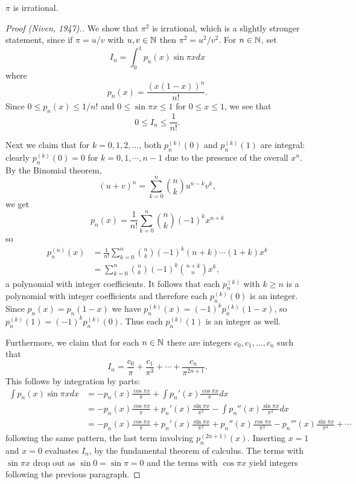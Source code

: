 \documentclass{mathnotes}
\begin{document}
\newpage
\begin{thm}[Lambert, 1761]
   $\pi$ is irrational.
\end{thm}
\begin{proof}[Proof (Niven, 1947).]
    We show that $\pi^2$ is irrational, which is a slightly stronger statement,
    since if $\pi=u/v$ with $u,v\in\mathbb{N}$ then $\pi^2=u^2/v^2$. For $n\in\mathbb{N}$, set
    \[I_n=\int_0^1p_n(x)\sin\pi x dx\]
    where 
    \[p_n(x)=\frac{(x(1-x))^n}{n!}.\]
    Since $0\leq p_n(x)\leq1/n!$ and $0\leq\sin\pi x\leq1$ for $0\leq x\leq 1$, we see that
    \begin{equation}
        0\leq I_n\leq\frac{1}{n!}.
        \label{eq:niven_est}
    \end{equation}

    Next we claim that for $k=0,1,2,\ldots$, both $p_n^{(k)}(0)$ and $p_n^{(k)}(1)$ are integral:
    clearly $p_n^{(k)}(0)=0$ for $k=0,1,\cdots,n-1$ due to the presence of the overall $x^n$. By
    the Binomial theorem,
    \[(u+v)^n=\sum_{k=0}^n \binom{n}{k}u^{n-k}v^k,\]
    we get
    \[p_n(x)=\frac{1}{n!}\sum_{k=0}^n\binom{n}{k}(-1)^kx^{n+k}\]
    so
    \begin{align*}
        p_n^{(n)}(x)&=\frac{1}{n!}\sum_{k=0}^n\binom{n}{k}(-1)^k(n+k)\cdots(1+k)x^k\\
        &=\sum_{k=0}^n\binom{n}{k}(-1)^k\binom{n+k}{n}x^k,
    \end{align*}
    a polynomial with integer coefficients. It follows that each $p_n^{(k)}$ with $k\geq n$
    is a polynomial with integer coefficients and therefore each $p_n^{(k)}(0)$ is an integer.
    Since $p_n(x)=p_n(1-x)$ we have $p_n^{(k)}(x)=(-1)^kp_n^{(k)}(1-x)$, so $p_n^{(k)}(1)=(-1)^kp_n^{(k)}(0)$.
    Thus each $p_n^{(k)}(1)$ is an integer as well.

    Furthermore, we claim that for each $n\in\mathbb{N}$ there are integers $c_0,c_1,\ldots,c_n$ such
    that
    \[I_n=\frac{c_0}{\pi}+\frac{c_1}{\pi^3}+\cdots+\frac{c_n}{\pi^{2n+1}}.\]
    This follows by integration by parts:
    \begin{align*}
        \int p_n(x)\sin\pi x dx &= -p_n(x)\frac{\cos\pi x}{\pi}+\int p_n'(x)\frac{\cos\pi x}{\pi} dx\\
        &=-p_n(x)\frac{\cos\pi x}{\pi} + p_n'(x)\frac{\sin\pi x}{\pi^2}-\int p_n''(x)\frac{\sin\pi x}{\pi^2}dx\\
        &= -p_n(x)\frac{\cos\pi x}{\pi}+p_n'(x)\frac{\sin \pi x}{\pi^2}+p_n''(x)\frac{\cos\pi x}{\pi^3}-p_n'''(x)\frac{\sin \pi x}{\pi^4}+\cdots
    \end{align*}
    following the same pattern, the last term involving $p_n^{(2n+1)}(x)$. Inserting $x=1$ and $x=0$ evaluates $I_n$,
    by the fundamental theorem of calculus. The terms with $\sin\pi x$ drop out as $\sin0=\sin\pi=0$ and the terms with
    $\cos\pi x$ yield integers following the previous paragraph.


\end{proof}
\end{document}
